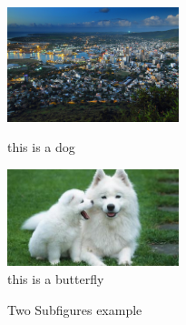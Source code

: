 \begin{figure}[hbtp]
	\begin{minipage}[t]{0.5\textwidth}
		\centering
		\includegraphics[width=5cm]{./image/ch1/1.jpg}
		\caption{this is a dog}
		\label{fig:side:a}
	\end{minipage}%
	\begin{minipage}[t]{0.5\textwidth}
		\centering
		\includegraphics[width=5cm]{./image/ch1/2.jpg}
		\caption{this is a butterfly}
		\label{fig:side:b}
	\end{minipage}
\end{figure}


\begin{figure}[!hbtp]
	\centering
	\hspace{1in}
	\caption{Two Subfigures example}
	\label{fig:subfig} %
\end{figure}

